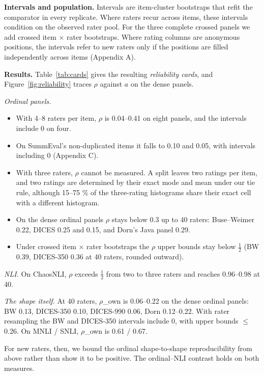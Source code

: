 \documentclass{article}
\providecommand{\tightlist}{\setlength{\itemsep}{0pt}\setlength{\parskip}{0pt}}
\begin{document}
\textbf{Intervals and population.} Intervals are item-cluster bootstraps that refit the comparator in every replicate. Where raters recur across items, these intervals condition on the observed rater pool. For the three complete crossed panels we add crossed item $\times$ rater bootstraps. Where rating columns are anonymous positions, the intervals refer to new raters only if the positions are filled independently across items (Appendix A).

\textbf{Results.} Table~\ref{tab:cards} gives the resulting \emph{reliability cards}, and Figure~\ref{fig:reliability} traces \(\rho\) against \(a\) on the dense panels.

\emph{Ordinal panels.}

\begin{itemize}
\tightlist
\item
  With 4--8 raters per item, $\rho$ is 0.04--0.41 on eight panels, and the intervals include 0 on four.
\item
  On SummEval's non-duplicated items it falls to 0.10 and 0.05, with intervals including 0 (Appendix C).
\item
  With three raters, $\rho$ cannot be measured. A split leaves two ratings per item, and two ratings are determined by their exact mode and mean under our tie rule, although 15--75 \% of the three-rating histograms share their exact cell with a different histogram.
\item
  On the dense ordinal panels $\rho$ stays below 0.3 up to 40 raters: Buse--Weimer 0.22, DICES 0.25 and 0.15, and Dorn's Java panel 0.29.
\item
  Under crossed item $\times$ rater bootstraps the $\rho$ upper bounds stay below $\tfrac12$ (BW 0.39, DICES-350 0.36 at 40 raters, rounded outward).
\end{itemize}

\emph{NLI.} On ChaosNLI, $\rho$ exceeds $\tfrac12$ from two to three raters and reaches 0.96--0.98 at 40.

\emph{The shape itself.} At 40 raters, $\rho$\_own is 0.06--0.22 on the dense ordinal panels: BW 0.13, DICES-350 0.10, DICES-990 0.06, Dorn 0.12--0.22. With rater resampling the BW and DICES-350 intervals include 0, with upper bounds $\leq$ 0.26. On MNLI / SNLI, $\rho$\_own is 0.61 / 0.67.

For new raters, then, we bound the ordinal shape-to-shape reproducibility from above rather than show it to be positive. The ordinal--NLI contrast holds on both measures.
\end{document}
